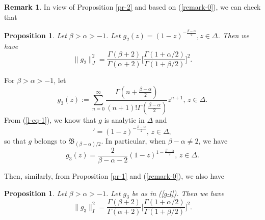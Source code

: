 \documentclass[10pt]{amsart}
\newtheorem{proposition}[theorem]{Proposition}
\theoremstyle{definition}    %
\newtheorem{remark}[theorem]{Remark}
\numberwithin{equation}{section}
\begin{document}
\begin{remark}
In view of Proposition \ref{pr-2} and based on (\ref{remark-0}), we can check that
\begin{proposition}
Let $\beta>\alpha>-1$. Let $g_2(z)=(1-z)^{-\frac{\beta-\alpha}{2}}, z\in \Delta$. Then we have 
$$\|g_2\|_{J}^2=\frac{\Gamma(\beta+2)}{\Gamma(\alpha+2)}\Big[\frac{\Gamma(1+\alpha/2)}{\Gamma(1+\beta/2)}\Big]^2.$$
\end{proposition}

For $\beta>\alpha>-1$, let 
\begin{equation}\label{g-l}g_3(z):=\sum_{n=0}^{\infty}\frac{\Gamma(n+\frac{\beta-\alpha}{2})}{(n+1)!\Gamma(\frac{\beta-\alpha}{2})}z^{n+1},\, z\in\Delta.\end{equation}
From (\ref{l-eq-1}), we know that $g$ is analytic in $\Delta$ and 
\begin{equation} 
[g_3(z)]'=(1-z)^{-\frac{\beta-\alpha}{2}},\, z\in \Delta,\nonumber \end{equation}so that $g$ belongs to $\mathfrak{B}_{(\beta-\alpha)/2}.$
In particular, when $\beta-\alpha\neq 2$, we have $$g_3(z)=\frac{2}{\beta-\alpha-2}(1-z)^{1-\frac{\beta-\alpha}{2}},\,z\in\Delta.$$

Then, similarly, from Proposition \ref{pr-1} and (\ref{remark-0}), we also have
\begin{proposition}
Let $\beta>\alpha>-1$. Let $g_3$ be as in (\ref{g-l}). Then we have 
$$\|g_3\|_{I}^2=\frac{\Gamma(\beta+2)}{\Gamma(\alpha+2)}\Big[\frac{\Gamma(1+\alpha/2)}{\Gamma(1+\beta/2)}\Big]^2.$$
\end{proposition}
\end{remark}
\end{document}
